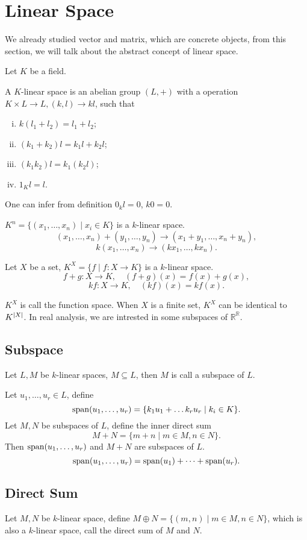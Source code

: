 \section{Linear Space}
We already studied vector and matrix, which are concrete objects,
from this section, we will talk about the abstract concept of linear space.

Let $K$ be a field.
\begin{defi}
A $K$-linear space is an abelian group $(L, +)$
with a operation $K \times L \to L, (k, l) \to kl$,
such that
\begin{enumerate}[i).]
\item $k(l_1 + l_2) = l_1 + l_2$;
\item $(k_1 + k_2)l = k_1 l + k_2 l$;
\item $(k_1 k_2)l = k_1(k_2l)$;
\item $1_K l = l$.
\end{enumerate}
\end{defi}
One can infer from definition $0_k l = 0$, $k 0 = 0$.
\begin{exmp}
$K^n = \{(x_1, \dots, x_n) \mid x_i \in K\}$ is a $k$-linear space.
$$(x_1, \dots, x_n) + (y_1, \dots, y_n) \to (x_1 + y_1, \dots, x_n + y_n),$$
$$k(x_1, \dots, x_n) \to (kx_1, \dots, kx_n).$$
\end{exmp}
\begin{exmp}
Let $X$ be a set, $K^X = \{f \mid f : X \to K\}$ is a $k$-linear space.
$$f + g : X \to K, \quad (f + g)(x) = f(x) + g(x),$$
$$kf : X \to K, \quad (kf)(x) = kf(x).$$
\end{exmp}
$K^X$ is call the function space. When $X$ is a finite set, $K^X$ can be identical to $K^{\abs{X}}$.
In real analysis, we are intrested in some subspaces of $\mathbb{R}^\mathbb{R}$.

\subsection{Subspace}
\begin{defi}
Let $L, M$ be $k$-linear spaces, $M \subseteq L$, then $M$ is call a subspace of $L$.
\end{defi}
Let $u_1, \dots, u_r \in L$, define
$$\sp(u_1, \dots, u_r) = \{k_1u_1 + \dots k_ru_r \mid k_i \in K\}.$$
Let $M, N$ be subspaces of $L$, define the inner direct sum
$$M + N = \{m+n \mid m \in M, n \in N\}.$$
Then $\sp(u_1, \dots, u_r)$ and $M + N$ are subspaces of $L$.
$$\sp(u_1, \dots, u_r) = \sp(u_1) + \dots + \sp(u_r).$$

\subsection{Direct Sum}
Let $M, N$ be $k$-linear space, define $M \oplus N = \{(m, n) \mid m\in M, n\in N\}$,
which is also a $k$-linear space, call the direct sum of $M$ and $N$.

